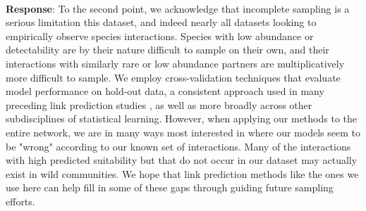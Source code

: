 \documentclass{article}
\begin{document}
    \\
    \textbf{Response}: To the second point, we acknowledge that incomplete sampling is a serious limitation this dataset, and indeed nearly all datasets looking to empirically observe species interactions. Species with low abundance or detectability are by their nature difficult to sample on their own, and their interactions with similarly rare or low abundance partners are multiplicatively more difficult to sample. We employ cross-validation techniques that evaluate model performance on hold-out data, a consistent approach used in many preceding link prediction studies \cite{strydom2021roadmap, dallas2017predicting, stock2021pairwise, kendall2019pollinator}, as well as more broadly across other subdisciplines of statistical learning. However, when applying our methods to the entire network, we are in many ways most interested in where our models seem to be "wrong" according to our known set of interactions. Many of the interactions with high predicted suitability but that do not occur in our dataset may actually exist in wild communities. We hope that link prediction methods like the ones we use here can help fill in some of these gaps through guiding future sampling efforts. 






\end{document}
